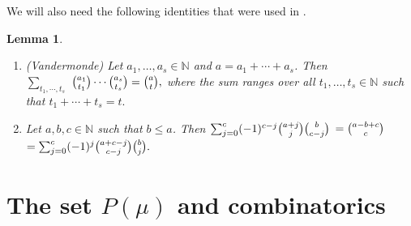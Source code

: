 \documentclass[11pt]{article}
\newtheorem{lemma}[theo]{Lemma}
\theoremstyle{definition}
\numberwithin{equation}{section}
\numberwithin{equation}{section}
\begin{document}
We will also need the following identities that were used in \cite{MS3}. 
\begin{lemma}\label{bin2} \;\begin{enumerate}
		
		\item \textup{(Vandermonde)} Let $a_1, \dots, a_s \in \mathbb{N}$ and $a=a_1+\cdots+a_s$. Then \\$\sum_{t_1,\cdots,t_s}$ $\tbinom{a_1}{ t_1}\cdots \tbinom{a_s}{t_s}=\tbinom{a}{t},$
			where the sum ranges over all $t_1,\dots,t_s \in \mathbb{N} $ such that $t_1+\cdots+t_s = t.$
		\item Let $a,b,c \in \mathbb{N}$  such that $ b \le a$. Then
		$\sum_{j=0}^{c}(-1)^{c-j}\tbinom{a+j}{j}\tbinom{b}{c-j}$ $=\tbinom{a-b+c}{c}$ $= \sum_{j=0}^{c}(-1)^{j}\tbinom{a+c-j}{c-j}\tbinom{b}{j}.$
	\end{enumerate}
\end{lemma}

\section{The set \texorpdfstring{$P(\mu)$}{P(mu)} and combinatorics}
	
\end{document}
